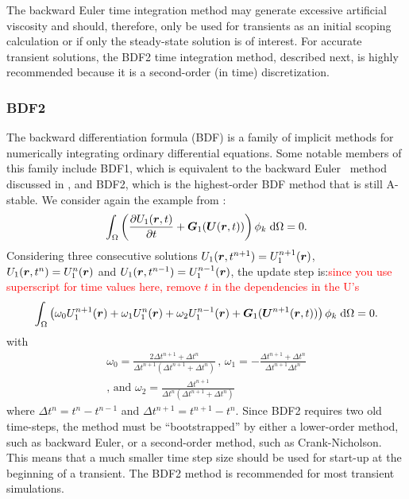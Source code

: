 The backward Euler time integration method may generate excessive artificial
viscosity and should, therefore, only be used for transients
as an initial scoping calculation or if only the steady-state solution is of
interest. For accurate transient solutions, the BDF2 time
integration method, described next, is highly recommended because it is
a second-order (in time) discretization.
\subsubsection{BDF2\label{sec:bdf2}}
The backward differentiation formula (BDF) is a family of implicit
methods for numerically integrating ordinary differential equations.
Some notable members of this family include BDF1, which is equivalent
to the backward Euler~\cite{Ascher_1998} method discussed in
, and BDF2, which is the highest-order
BDF method that is still A-stable. We consider again the example from : 
\begin{align}
  \int_{\Omega} \left(\frac{\partial U_1(\boldsymbol r,t)}{\partial t} + \boldsymbol G_1(\boldsymbol U(\boldsymbol r,t)) \right) \phi_k \; \text{d}{\Omega} = 0.
\end{align}
Considering three consecutive solutions $U_1(\boldsymbol r,t^{n+1}) = U_1^{n+1}(\boldsymbol r)$, $U_1(\boldsymbol r,t^{n}) = U_1^n(\boldsymbol r)$ and $U_1(\boldsymbol r,t^{n-1})=U_1^{n-1}(\boldsymbol r)$, the update step is:\textcolor{red}{since you use superscript for time values here, remove $t$ in the dependencies in the U's}
%
\begin{align}
\label{eqn:bdf2}
  \int_{\Omega} \left(\omega_0 U_1^{n+1}(\boldsymbol r)+\omega_1 U_1^{n}(\boldsymbol r)+\omega_2 U_1^{n-1}(\boldsymbol r) + \boldsymbol G_1(\boldsymbol U^{n+1}(\boldsymbol r,t)) \right) \phi_k \; \text{d}{\Omega} = 0.
\end{align}
%
with
%
\begin{multline}
\omega_0 =\frac{2\Delta t^{n+1}+\Delta t^n}{\Delta t^{n+1} \left( \Delta t^{n+1}+\Delta t^n \right)} \,,\,
\omega_1 = -\frac{\Delta t^{n+1}+\Delta t^n}{\Delta t^{n+1} \Delta t^n}  \\
\text{, and } \omega_2 = \frac{\Delta t^{n+1}}{\Delta t^n \left( \Delta t^{n+1} + \Delta t^n \right)} \nonumber
\end{multline}
%
where $\Delta t^{n} = t^n-t^{n-1}$ and $\Delta t^{n+1} = t^{n+1}-t^{n}$.
Since BDF2 requires two old time-steps, the method must be
``bootstrapped'' by either a lower-order method, such as backward Euler, or a second-order method, such as Crank-Nicholson.  This means that a much smaller time step size should be used
for start-up at the beginning of a transient.  The BDF2 method is 
recommended for most transient simulations.
